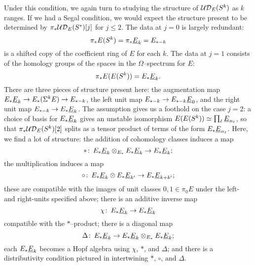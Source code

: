 Under this condition, we again turn to studying the structure of $\mathcal{UD}_E(S^k)$ as $k$ ranges.  If we had a Segal condition, we would expect the structure present to be determined by $\pi_* \mathcal{UD}_E(S^*)[j]$ for $j \le 2$.  The data at $j = 0$ is largely redundant: \[\pi_* E(S^k) = \pi_* \underline{\smash{E}}_{k} = E_{*-k}\] is a shifted copy of the coefficient ring of $E$ for each $k$.  The data at $j = 1$ consists of the homology groups of the spaces in the $\Omega$--spectrum for $E$: \[\pi_* E(E(S^k)) = E_* \underline{\smash{E}}_{k}.\]  There are three pieces of structure present here: the augmentation map $E_* \underline{\smash{E}}_{k} \to E_* (\Sigma^k E) \to E_{*-k}$, the left unit map $E_{*-k} \to E_{*-k} \underline{\smash{E}}_{0}$, and the right unit map $E_{*-k} \to E_* \underline{\smash{E}}_{k}$.  The assumption {\UFH} gives us a foothold on the case $j = 2$: a choice of basis for $E_* \underline{\smash{E}}_{k}$ gives an unstable isomorphism $E(E(S^k)) \simeq \prod_\ell \underline{\smash{E}}_{n_\ell}$, so that $\pi_* \mathcal{UD}_E(S^k)[2]$ splits as a tensor product of terms of the form $E_* \underline{\smash{E}}_{n_\ell}$.  Here, we find a lot of structure: the addition of cohomology classes induces a map \[\ast\colon\thinspace E_* \underline{\smash{E}}_{k} \otimes_{E_*} E_* \underline{\smash{E}}_{k} \to E_* \underline{\smash{E}}_{k};\] the multiplication induces a map \[\circ\colon\thinspace E_* \underline{\smash{E}}_{k} \otimes E_* \underline{\smash{E}}_{k'} \to E_* \underline{\smash{E}}_{k+k'};\] these are compatible with the images of unit classes $0, 1 \in \pi_0 E$ under the left- and right-units specified above; there is an additive inverse map \[\chi\colon\thinspace E_* \underline{\smash{E}}_{k} \to E_* \underline{\smash{E}}_{k}\] compatible with the $\ast$--product; there is a diagonal map \[\Delta\colon\thinspace E_* \underline{\smash{E}}_{k} \to E_* \underline{\smash{E}}_{k} \otimes_{E_*} E_* \underline{\smash{E}}_{k};\] each $E_* \underline{\smash{E}}_{k}$ becomes a Hopf algebra using $\chi$, $\ast$, and $\Delta$; and there is a distributivity condition pictured in  intertwining $\ast$, $\circ$, and $\Delta$.

